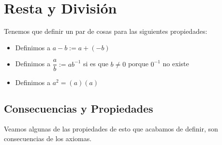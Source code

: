 \documentclass[12pt, fleqn]{report}                             %
\theoremstyle{break}                                            %
\begin{document}
            
        \clearpage
        \section{Resta y División}

            Tenemos que definir un par de cosas para las siguientes propiedades:

            \begin{itemize}
                \item 
                    Definimos a $a - b := a + (-b)$
                \item
                    Definimos a $\dfrac{a}{b} := ab^{-1}$ si es que $b \neq 0$
                    porque $0^{-1}$ no existe
                \item
                    Definimos a $a^2 = (a)(a)$
            \end{itemize}


            \clearpage
            \subsection{Consecuencias y Propiedades}

                Veamos algunas de las propiedades de esto que acabamos de definir, son consecuencias de los 
                axiomas.
\end{document}
